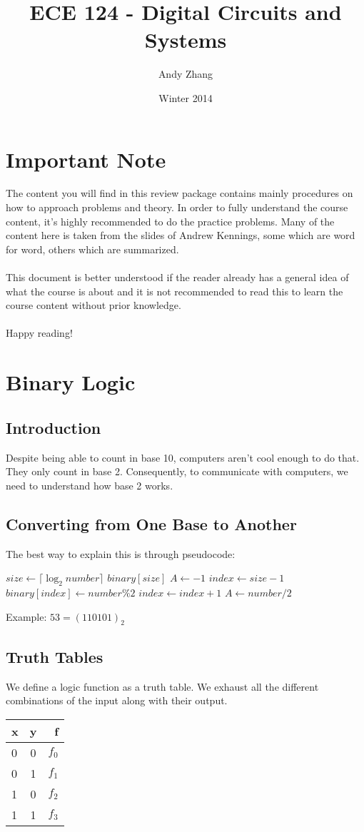 \documentclass[12pt]{report}
\title{ECE 124 - Digital Circuits and Systems}
\author{Andy Zhang}
\date{Winter 2014}
\begin{document}
\maketitle
\tableofcontents
\chapter{Important Note}
	The content you will find in this review package contains mainly procedures on how to approach problems and theory. In order to fully understand the course content, it's highly recommended to do the practice problems. Many of the content here is taken from the slides of Andrew Kennings, some which are word for word, others which are summarized. \\
	\\
	This document is better understood if the reader already has a general idea of what the course is about and it is not recommended to read this to learn the course content without prior knowledge. \\
	\\
	Happy reading!
\chapter{Binary Logic}
	\section{Introduction}
			Despite being able to count in base 10, computers aren't cool enough to do that. They only count in base 2. Consequently, to communicate with computers, we need to understand how base 2 works.
	\section{Converting from One Base to Another}
		The best way to explain this is through pseudocode:
			\begin{algorithmic}
				\STATE $size \gets \lceil \log_2 number \rceil$
				\STATE $binary[size]$
				\STATE $A \gets -1$
				\STATE $index \gets size-1$
					\STATE $binary[index] \gets number \% 2$
					\STATE $index \gets index + 1$ 
					\STATE $A \gets number / 2$
				\ENDWHILE
			\end{algorithmic}
		Example: $53 = (110101)_2$
	\section{Truth Tables}
		We define a logic function as a truth table. We exhaust all the different combinations of the input along with their output.\\
		\begin{tabular}{ l | c || r }
			x & y & f \\
			\hline
			0 & 0 & $f_0$ \\
			0 & 1 & $f_1$ \\
			1 & 0 & $f_2$ \\
			1 & 1 & $f_3$ \\
		\end{tabular}
\end{document}
